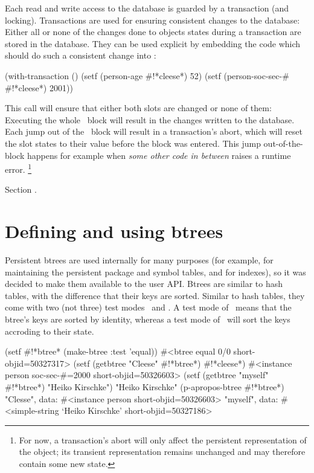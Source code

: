 Each read and write access to the database is guarded by a transaction
(and locking). Transactions are used for ensuring consistent changes
to the database: Either all or none of the changes done to objects
states during a transaction are stored in the database. They can be
used explicit by embedding the code which should do such a consistent
change into :
\begin{CompactCode}
\listener{}(with-transaction ()
              (setf (person-age #!*cleese*) 52)
              (setf (person-soc-sec-# #!*cleese*) 2001))
\end{CompactCode}

This call will ensure that either both slots are changed or none of
them: Executing the whole \ block will
result in the changes written to the database. Each jump out of the
\ block will result in a transaction's
abort, which will reset the slot states to their value before the
block was entered. This jump out-of-the-block happens for example when
\emph{\lt{}some other code in between\gt} raises a runtime error.
\footnote{For now, a transaction's abort will only affect the
  persistent representation of the object; its transient
  representation remains unchanged and may therefore contain some new
  state.}

 Section .

\section{Defining and using btrees}

Persistent btrees are used internally for many purposes (for example,
for maintaining the persistent package and symbol tables, and for
indexes), so it was decided to make them available to the user API.
Btrees are similar to hash tables, with the difference that their keys
are sorted. Similar to hash tables, they come with two (not three)
test modes \ and . A test mode of \ 
means that the btree's keys are sorted by identity, whereas a test
mode of \lisp{equal}\ will sort the keys accroding to their state.
\begin{CompactCode}
\listener{}(setf #!*btree* (make-btree :test 'equal))
#<btree equal 0/0 short-objid=50327317>
\listener{}(setf (getbtree "Cleese" #!*btree*) #!*cleese*)
#<instance person soc-sec-#=2000 short-objid=50326603>
\listener{}(setf (getbtree "myself" #!*btree*) "Heiko Kirschke")
"Heiko Kirschke"
\listener{}(p-apropos-btree #!*btree*)
"Clesse", data: #<instance person short-objid=50326603>
"myself", data: #<simple-string `Heiko Kirschke' short-objid=50327186>
\end{CompactCode}

